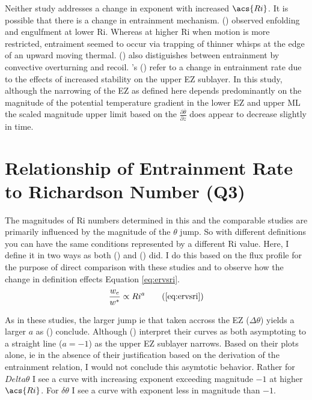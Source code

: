 Neither study addresses a change in exponent with increased $\acs{Ri}$.  It is possible that there is a change in entrainment mechanism. \citeauthor{SullMoengStev} (\citeyear{SullMoengStev}) observed enfolding and engulfment at lower \acs{Ri}.  Whereas at higher \acs{Ri} when motion is more restricted, entraiment seemed to occur via trapping of thinner whisps at the edge of an upward moving thermal.  \citeauthor{Turner86} (\citeyear{Turner86}) also distiguishes between entrainment by convective overturning and recoil. \citeauthor{GarciaMellado}'s (\citeyear{GarciaMellado}) refer to a change in entrainment rate due to the effects of increased stability on the upper \acs{EZ} sublayer.  In this study, although the narrowing of the \acs{EZ} as defined here depends predominantly on the magnitude of the potential temperature gradient in the lower \acs{EZ} and upper \acs{ML} the scaled magnitude upper limit based on the $\frac{\partial \overline{\theta}}{\partial z}$ does appear to decrease slightly in time.\\

\section{Relationship of Entrainment Rate to Richardson Number (Q3)}

The magnitudes of \acs{Ri} numbers determined in this and the comparable studies are primarily influenced by the magnitude of the $\theta$ jump. So with different definitions you can have the same conditions represented by a different \acs{Ri} value. Here, I define it in two ways as both \citeauthor{FedConzMir04} (\citeyear{FedConzMir04}) and \citeauthor{GarciaMellado} (\citeyear{GarciaMellado}) did.  I do this based on the flux profile for the purpose of direct comparison with these studies and to observe how the change in definition effects Equation \ref{eq:ervsri}.\\

\begin{equation}
\frac{w_{e}}{w^{*}} \propto Ri^{a} \tag{\ref{eq:ervsri}}
\end{equation}

As in these studies, the larger jump ie that taken accross the \acs{EZ} ($\Delta \theta$) yields a larger $a$ as \citeauthor{FedConzMir04} (\citeyear{FedConzMir04}) conclude.  Although \citeauthor{GarciaMellado} (\citeyear{GarciaMellado}) interpret their curves as both asymptoting to a straight line ($a=-1$) as the upper \acs{EZ} sublayer narrows. Based on their plots alone, ie in the absence of their justification based on the derivation of the entrainment relation, I would not conclude this asymtotic behavior.  Rather for $Delta \theta$ I see a curve with increasing exponent exceeding magnitude $-1$ at higher $\acs{Ri}$.  For $\delta \theta$ I see a curve with exponent less in magnitude than $-1$.\\

